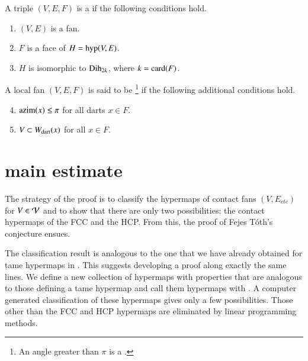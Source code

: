 \documentclass{llncs}
\def\op#1{{\hbox{#1}}}
\begin{document}
\begin{definition} \label{def:convex-local}
A triple $(V,E,F)$ is a  if the following conditions hold.
\begin{enumerate} 
\item {} $(V,E)$ is a fan.
\item {} $F$ is a face of $H = \op{hyp}(V,E)$.
\item {} $H$ is isomorphic to $\op{Dih}_{2k}$, where $k =
\card(F)$.
\end{enumerate}
A local fan $(V,E,F)$ is said to be \footnote{An angle
greater than $\pi$ is a .} if the following
additional conditions hold.
\begin{enumerate}
\setcounter{enumi}{3}
\item %
 $\op{azim}(x)\le \pi$ for all darts $x\in F$.
\item {} $V\subset W_{\text{dart}}(x)$ for all $x\in F$.
\end{enumerate}
\end{definition}
%



\section{main estimate}

The strategy of the proof is to classify the hypermaps of contact
fans $(V,E_{ctc})$ for $V\in {\mathcal V}$ and to show that there are only two
possibilities: the contact hypermaps of the FCC and the HCP.  From
this, the proof of Fejes T\'oth's conjecture ensues.

The classification result is analogous to the one that we have already
obtained for tame hypermaps in \cite{dsp}.  
This suggests developing a proof along
exactly the same lines.  We define a new
collection of hypermaps with properties that are analogous to those
defining a tame hypermap and call them hypermaps with 
.  A computer generated classification of these hypermaps
gives only a few possibilities.  Those other than the FCC and
HCP hypermaps are eliminated by linear programming methods.
\end{document}
